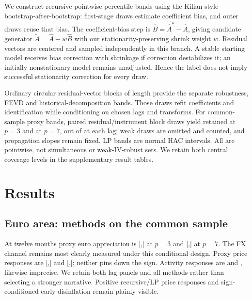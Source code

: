 We construct recursive pointwise percentile bands using the Kilian-style bootstrap-after-bootstrap: \BiasDraws{} first-stage draws estimate coefficient bias, and \OuterDraws{} outer draws reuse that bias. The coefficient-bias step is $\widehat B=\overline{\widehat A^{*}}-\widehat A$, giving candidate generator $\widetilde A=\widehat A-w\widehat B$ with our stationarity-preserving shrink weight $w$. Residual vectors are centered and sampled independently in this branch. A stable starting model receives bias correction with shrinkage if correction destabilizes it; an initially nonstationary model remains unadjusted. Hence the label does not imply successful stationarity correction for every draw.

Ordinary circular residual-vector blocks of length \BlockLength{} provide the separate robustness, FEVD and historical-decomposition bands. Those draws refit coefficients and identification while conditioning on chosen lags and transforms. For common-sample proxy bands, paired residual/instrument block draws yield \PThreeDraws{} retained at $p=3$ and \PSevenDraws{} at $p=7$, out of \OuterDraws{} at each lag; weak draws are omitted and counted, and propagation slopes remain fixed. LP bands are normal HAC intervals. All are pointwise, not simultaneous or weak-IV-robust sets. We retain both central coverage levels in the supplementary result tables.
\section{Results}
\subsection{Euro area: methods on the common sample}

At twelve months proxy euro appreciation is \PThreeFXPoint{} [\PThreeFXLow{},\PThreeFXHigh{}] at $p=3$ and \PSevenFXPoint{} [\PSevenFXLow{},\PSevenFXHigh{}] at $p=7$. The FX channel remains most clearly measured under this conditional design. Proxy price responses are \PThreePricePoint{} [\PThreePriceLow{},\PThreePriceHigh{}] and \PSevenPricePoint{} [\PSevenPriceLow{},\PSevenPriceHigh{}]; neither pins down the sign. Activity responses are \PThreeIPPoint{} and \PSevenIPPoint{}, likewise imprecise. We retain both lag panels and all methods rather than selecting a stronger narrative. Positive recursive/LP price responses and sign-conditioned early disinflation remain plainly visible.

